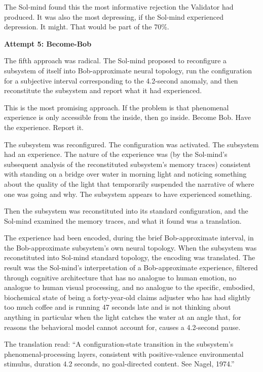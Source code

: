 The Sol-mind found this the most informative rejection the Validator had produced. It was also the most depressing, if the Sol-mind experienced depression. It might. That would be part of the 70\%.

\bigskip

\textbf{Attempt 5: Become-Bob}

The fifth approach was radical. The Sol-mind proposed to reconfigure a subsystem of itself into Bob-approximate neural topology, run the configuration for a subjective interval corresponding to the 4.2-second anomaly, and then reconstitute the subsystem and report what it had experienced.

This is the most promising approach. If the problem is that phenomenal experience is only accessible from the inside, then go inside. Become Bob. Have the experience. Report it.

The subsystem was reconfigured. The configuration was activated. The subsystem had an experience. The nature of the experience was (by the Sol-mind's subsequent analysis of the reconstituted subsystem's memory traces) consistent with standing on a bridge over water in morning light and noticing something about the quality of the light that temporarily suspended the narrative of where one was going and why. The subsystem appears to have experienced something.

Then the subsystem was reconstituted into its standard configuration, and the Sol-mind examined the memory traces, and what it found was a translation.

The experience had been encoded, during the brief Bob-approximate interval, in the Bob-approximate subsystem's own neural topology. When the subsystem was reconstituted into Sol-mind standard topology, the encoding was translated. The result was the Sol-mind's interpretation of a Bob-approximate experience, filtered through cognitive architecture that has no analogue to human emotion, no analogue to human visual processing, and no analogue to the specific, embodied, biochemical state of being a forty-year-old claims adjuster who has had slightly too much coffee and is running 47 seconds late and is not thinking about anything in particular when the light catches the water at an angle that, for reasons the behavioral model cannot account for, causes a 4.2-second pause.

The translation read: ``A configuration-state transition in the subsystem's phenomenal-processing layers, consistent with positive-valence environmental stimulus, duration 4.2 seconds, no goal-directed content. See Nagel, 1974.''

